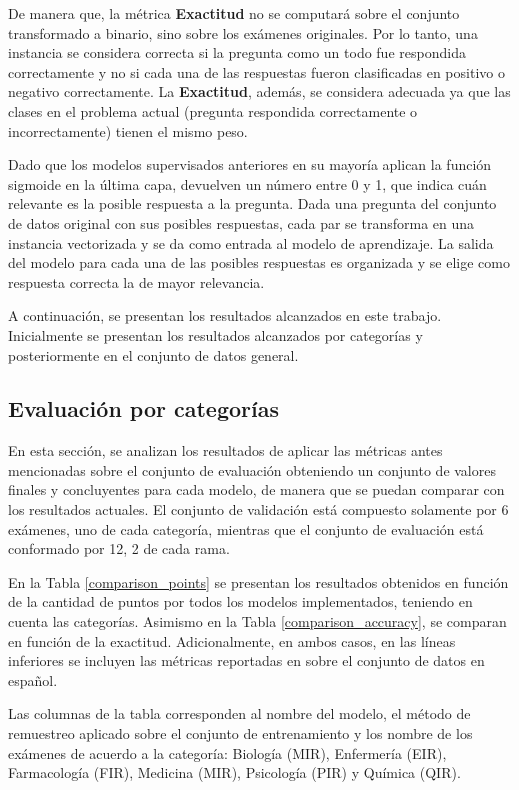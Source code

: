 De manera que, la métrica \textbf{Exactitud} no se computará sobre el conjunto transformado a binario, sino sobre los exámenes originales. Por lo tanto, una instancia se considera correcta si la pregunta como un todo fue respondida correctamente y no si cada una de las respuestas fueron clasificadas en positivo o negativo correctamente. La \textbf{Exactitud}, además, se considera adecuada ya que las clases en el problema actual (pregunta respondida correctamente o incorrectamente) tienen el mismo peso.

Dado que los modelos supervisados anteriores en su mayoría aplican la función sigmoide en la última capa, devuelven un número entre 0 y 1, que indica cuán relevante es la posible respuesta a la pregunta. Dada una pregunta del conjunto de datos original con sus posibles respuestas, cada par se transforma en una instancia vectorizada y se da como entrada al modelo de aprendizaje. La salida del modelo para cada una de las posibles respuestas es organizada y se elige como respuesta correcta la de mayor relevancia.

A continuación, se presentan los resultados alcanzados en este trabajo. Inicialmente se presentan los resultados alcanzados por categorías y posteriormente en el conjunto de datos general.

\subsection{Evaluación por categorías}

En esta sección, se analizan los resultados de aplicar las métricas antes mencionadas sobre el conjunto de evaluación obteniendo un conjunto de valores finales y concluyentes para cada modelo, de manera que se puedan comparar con los resultados actuales. El conjunto de validación está compuesto solamente por 6 exámenes, uno de cada categoría, mientras que el conjunto de evaluación está conformado por 12, 2 de cada rama.

En la Tabla \ref{comparison_points} se presentan los resultados obtenidos en función de la cantidad de puntos por todos los modelos implementados, teniendo en cuenta las categorías. Asimismo en la Tabla \ref{comparison_accuracy}, se comparan en función de la exactitud. Adicionalmente, en ambos casos, en las líneas inferiores se incluyen las métricas reportadas en \cite{2019-head-qa} sobre el conjunto de datos en español. 

Las columnas de la tabla corresponden al nombre del modelo, el método de remuestreo aplicado sobre el conjunto de entrenamiento y los nombre de los exámenes de acuerdo a la categoría: Biología (MIR), Enfermería (EIR), Farmacología (FIR), Medicina (MIR), Psicología (PIR) y Química (QIR). 


